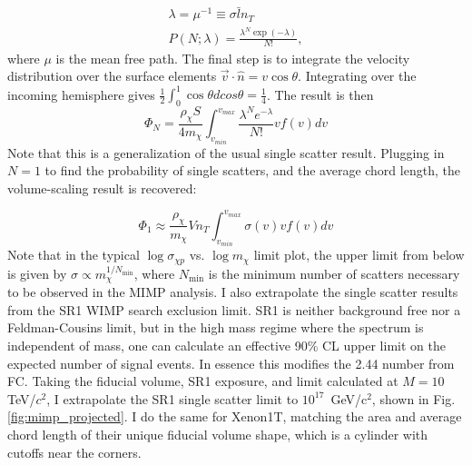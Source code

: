 \begin{align}
    \lambda = \mu^{-1} \equiv   \sigma \bar l n_T\\
    P(N; \lambda) = \frac{\lambda^N \exp (- \lambda)}{N!},
\end{align}
\noindent
where $\mu$ is the mean free path.
The final step is to integrate the velocity distribution over the surface elements $\vec v \cdot \hat n = v \cos \theta$.
Integrating over the incoming hemisphere gives $ \frac{1}{2}\int_0^1 \cos \theta d cos \theta = \frac{1}{4}$.
The result is then 
\begin{equation}
    \Phi_N = \frac{\rho_\chi S}{4 m_\chi} \int_{v_{min}}^{v_{max}}  \frac{\lambda^N e^{- \lambda }}{N!}  v f(v) dv 
\end{equation}
\noindent
Note that this is a generalization of the usual single scatter result.
Plugging in $N=1$ to find the probability of single scatters, and the average chord length, the volume-scaling result is recovered: 

\begin{equation}
    \Phi_1 \approx  \frac{\rho_\chi}{ m_\chi} Vn_T \int_{v_{min}}^{v_{max}} \sigma(v)   v f(v) dv 
\end{equation}
\noindent
Note that in the typical $\log \sigma_{\chi p}$ vs. $\log m_\chi$ limit plot, the upper limit from below is given by $\sigma \propto m_\chi^{1/N_{\mathrm{min}}}$, where $N_{\mathrm {min}}$ is the minimum number of scatters necessary to be observed in the MIMP analysis.
I also extrapolate the single scatter results from the SR1 WIMP search exclusion limit\cite{aalbers_first_2022}.
SR1 is neither background free nor a Feldman-Cousins limit, but in the high mass regime where the spectrum is independent of mass, one can calculate an effective 90\% CL upper limit on the expected number of signal events.
In essence this modifies the 2.44 number from FC.
Taking the fiducial volume, SR1 exposure, and limit calculated at $M=10$ TeV/$c^2$, I extrapolate the SR1 single scatter limit to $10^{17}$~GeV/c$^2$, shown in Fig. \ref{fig:mimp_projected}.
I do the same for Xenon1T, matching the area and average chord length of their unique fiducial volume shape\cite{xenon_collaboration_7_dark_2018}, which is a cylinder with cutoffs near the corners.

